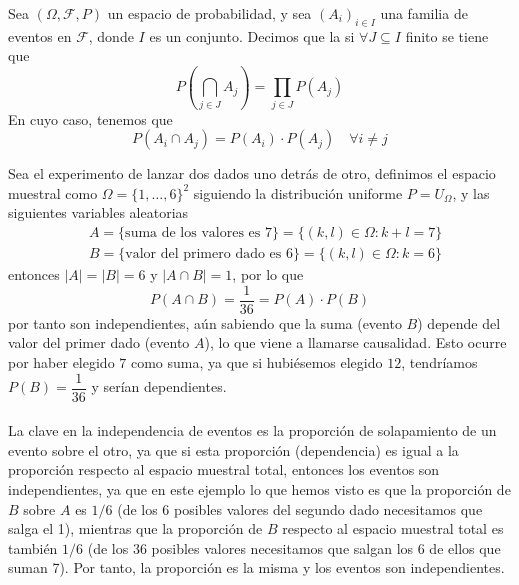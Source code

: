 \begin{definicion}
    Sea $(\Omega, \mathcal{F}, P)$ un espacio de probabilidad, y sea $(A_i)_{i\in I}$ una familia de eventos en $\mathcal{F}$, donde $I$ es un conjunto. Decimos que la  si $\forall J\subseteq I$ finito se tiene que 
    \begin{equation*}
        P\left(\bigcap_{j\in J} A_j\right) = \prod_{j\in J} P(A_j)
    \end{equation*}
    En cuyo caso, tenemos que 
    \begin{equation*}
        P(A_i \cap A_j) = P(A_i) \cdot P(A_j) \quad \forall i\neq j
    \end{equation*}
\end{definicion}

\begin{ejemplo}
    Sea el experimento de lanzar dos dados uno detrás de otro, definimos el espacio muestral como $\Omega = \{1, \ldots, 6\}^2$ siguiendo la distribución uniforme $P=U_{\Omega}$, y las siguientes variables aleatorias
    \begin{align*}
        &A=\{\text{suma de los valores es 7}\}=\{ (k,l) \in \Omega : k+l=7 \} \\
        &B=\{\text{valor del primero dado es 6}\}=\{ (k,l) \in \Omega : k=6 \}
    \end{align*}
    entonces $|A|=|B|=6$ y $|A\cap B|=1$, por lo que
    \begin{equation*}
        P(A\cap B)=\dfrac{1}{36} = P(A) \cdot P(B)
    \end{equation*}
    por tanto son independientes, aún sabiendo que la suma (evento $B$) depende del valor del primer dado (evento $A$), lo que viene a llamarse causalidad. Esto ocurre por haber elegido $7$ como suma, ya que si hubiésemos elegido $12$, tendríamos $P(B)=\dfrac{1}{36}$ y serían dependientes. \\ \\
    \noindent
    La clave en la independencia de eventos es la proporción de solapamiento de un evento sobre el otro, ya que si esta proporción (dependencia) es igual a la proporción respecto al espacio muestral total, entonces los eventos son independientes, ya que en este ejemplo lo que hemos visto es que la proporción de $B$ sobre $A$ es $1/6$ (de los 6 posibles valores del segundo dado necesitamos que salga el 1), mientras que la proporción de $B$ respecto al espacio muestral total es también $1/6$ (de los 36 posibles valores necesitamos que salgan los 6 de ellos que suman 7). Por tanto, la proporción es la misma y los eventos son independientes. \\
\end{ejemplo}

